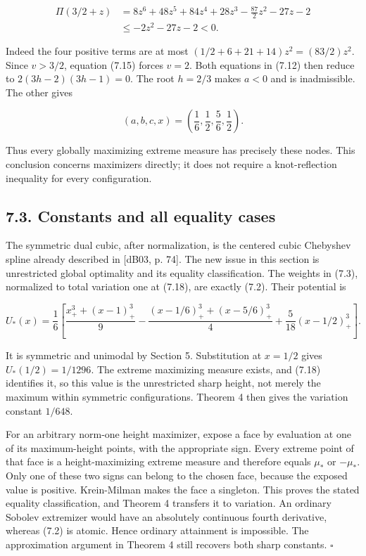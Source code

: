 \documentclass[11pt]{article}
\begin{document}
\[
\begin{aligned}
\Pi(3/2+z)
&=8z^6+48z^5+84z^4+28z^3
 -\frac{87}{2}z^2-27z-2\\
&\le -2z^2-27z-2<0.
\end{aligned}
\tag{7.17}
\]

Indeed the four positive terms are at most
\((1/2+6+21+14)z^2=(83/2)z^2\). Since \(v>3/2\), equation (7.15) forces
\(v=2\). Both equations in (7.12) then reduce to \(2(3h-2)(3h-1)=0\).
The root \(h=2/3\) makes \(a<0\) and is inadmissible. The other gives

\[
(a,b,c,x)=\left(\frac16,\frac12,\frac56,\frac12\right).
\tag{7.18}
\]

Thus every globally maximizing extreme measure has precisely these
nodes. This conclusion concerns maximizers directly; it does not require
a knot-reflection inequality for every configuration.

\subsection{7.3. Constants and all equality
cases}\label{constants-and-all-equality-cases}

The symmetric dual cubic, after normalization, is the centered cubic
Chebyshev spline already described in {[}dB03, p. 74{]}. The new issue
in this section is unrestricted global optimality and its equality
classification. The weights in (7.3), normalized to total variation one
at (7.18), are exactly (7.2). Their potential is

\[
U_*(x)=\frac16\left[
\frac{x_+^3+(x-1)_+^3}{9}
-\frac{(x-1/6)_+^3+(x-5/6)_+^3}{4}
+\frac5{18}(x-1/2)_+^3\right].
\tag{7.19}
\]

It is symmetric and unimodal by Section 5. Substitution at \(x=1/2\)
gives \(U_*(1/2)=1/1296\). The extreme maximizing measure exists, and
(7.18) identifies it, so this value is the unrestricted sharp height,
not merely the maximum within symmetric configurations. Theorem 4 then
gives the variation constant \(1/648\).

For an arbitrary norm-one height maximizer, expose a face by evaluation
at one of its maximum-height points, with the appropriate sign. Every
extreme point of that face is a height-maximizing extreme measure and
therefore equals \(\mu_*\) or \(-\mu_*\). Only one of these two signs
can belong to the chosen face, because the exposed value is positive.
Krein-Milman makes the face a singleton. This proves the stated equality
classification, and Theorem 4 transfers it to variation. An ordinary
Sobolev extremizer would have an absolutely continuous fourth
derivative, whereas (7.2) is atomic. Hence ordinary attainment is
impossible. The approximation argument in Theorem 4 still recovers both
sharp constants. \(\square\)
\end{document}
